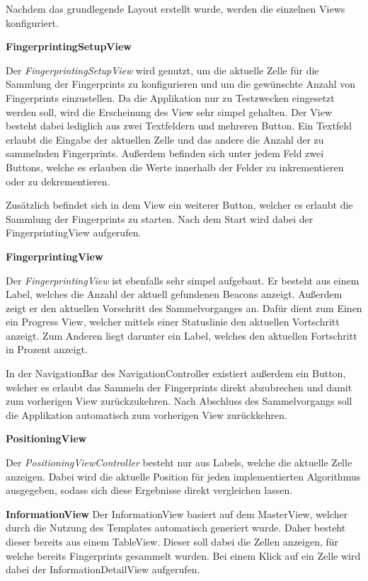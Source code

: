 Nachdem das grundlegende Layout erstellt wurde, werden die einzelnen Views konfiguriert.

\textbf{FingerprintingSetupView}


Der \emph{FingerprintingSetupView} wird genutzt, um die aktuelle Zelle für die Sammlung der Fingerprints zu konfigurieren und um die gewünschte Anzahl von Fingerprints einzustellen. Da die Applikation nur zu Testzwecken eingesetzt werden soll, wird die Erscheinung des View sehr simpel gehalten. 
Der View besteht dabei lediglich aus zwei Textfeldern und mehreren Button. 
Ein Textfeld erlaubt die Eingabe der aktuellen Zelle und das andere die Anzahl der zu sammelnden Fingerprints.
Außerdem befinden sich unter jedem Feld zwei Buttons, welche es erlauben die Werte innerhalb der Felder zu inkrementieren oder zu dekrementieren.

Zusätzlich befindet sich in dem View ein weiterer Button, welcher es erlaubt die Sammlung der Fingerprints zu starten. 
Nach dem Start wird dabei der FingerprintingView aufgerufen.


\textbf{FingerprintingView}

Der \emph{FingerprintingView} ist ebenfalls sehr simpel aufgebaut.
Er besteht aus einem Label, welches die Anzahl der aktuell gefundenen Beacons anzeigt.
Außerdem zeigt er den aktuellen Vorschritt des Sammelvorganges an. Dafür dient zum Einen ein Progress View, welcher mittels einer Statuslinie den aktuellen Vortschritt anzeigt. Zum Anderen liegt darunter ein Label, welches den aktuellen Fortschritt in Prozent anzeigt.

In der NavigationBar des NavigationController existiert außerdem ein Button, welcher es erlaubt das Sammeln der Fingerprints direkt abzubrechen und damit zum vorherigen View zurückzukehren. Nach Abschluss des Sammelvorgangs soll die Applikation automatisch zum vorherigen View zurückkehren.


\textbf{PositioningView}

Der \emph{PositioningViewController} besteht nur aus Labels, welche die aktuelle Zelle anzeigen. Dabei wird die aktuelle Position für jeden implementierten Algorithmus ausgegeben, sodass sich diese Ergebnisse direkt vergleichen lassen. 


\textbf{InformationView} 
Der InformationView basiert auf dem MasterView, welcher durch die Nutzung des Templates automatisch generiert wurde. Daher besteht dieser bereits aus einem TableView.
Dieser soll dabei die Zellen anzeigen, für welche bereits Fingerprints gesammelt wurden. Bei einem Klick auf ein Zelle wird dabei der InformationDetailView aufgerufen.

